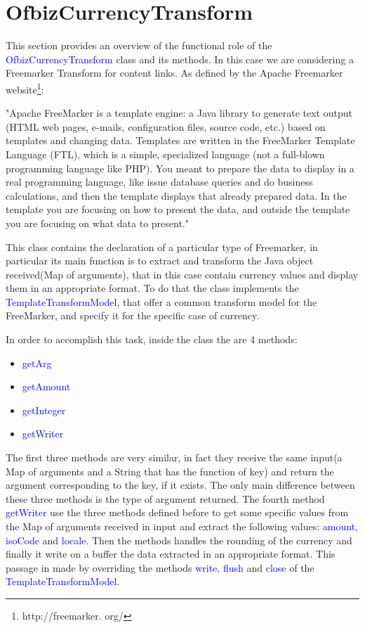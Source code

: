 \section{OfbizCurrencyTransform}
This section provides an overview of the functional role of the \textcolor{blue}{OfbizCurrencyTransform} class and its methods. 
In this case we are considering a Freemarker Transform for content links.
As defined by the Apache Freemarker website\footnote{http://freemarker. org/}:

"Apache FreeMarker is a template engine: a Java library to generate text output (HTML web pages, e-mails, configuration files, source code, etc.) based on templates and changing data. Templates are written in the FreeMarker Template Language (FTL), which is a simple, specialized language (not a full-blown programming language like PHP). You meant to prepare the data to display in a real programming language, like issue database queries and do business calculations, and then the template displays that already prepared data. In the template you are focusing on how to present the data, and outside the template you are focusing on what data to present."

This class contains the declaration of a particular type of Freemarker, in particular its main function is to extract and transform the Java object received(Map of arguments), that in this case contain currency values and display them in an appropriate format. To do that the class implements the \textcolor{blue}{TemplateTransformModel}, that offer a common transform model for the FreeMarker, and specify it for the specific case of currency.

In order to accomplish this task, inside the class the are 4 methods:
\begin{itemize}
\item \textcolor{blue}{getArg}
\item \textcolor{blue}{getAmount}
\item \textcolor{blue}{getInteger}
\item \textcolor{blue}{getWriter}
\end{itemize}

The first three methods are very similar, in fact they receive the same input(a Map of arguments and a String that has the function of key) and return the argument corresponding to the key, if it exists. The only main difference between these three methods is the type of argument returned.
The fourth method \textcolor{blue}{getWriter} use the three methods defined before to get some specific values from the Map of arguments received in input and extract the following values: \textcolor{blue}{amount}, \textcolor{blue}{isoCode} and \textcolor{blue}{locale}.
Then the methods handles the rounding of the currency and finally it write on a buffer the data extracted in an appropriate format. This passage in made by overriding the methods \textcolor{blue}{write}, \textcolor{blue}{flush} and \textcolor{blue}{close} of the \textcolor{blue}{TemplateTransformModel}.

